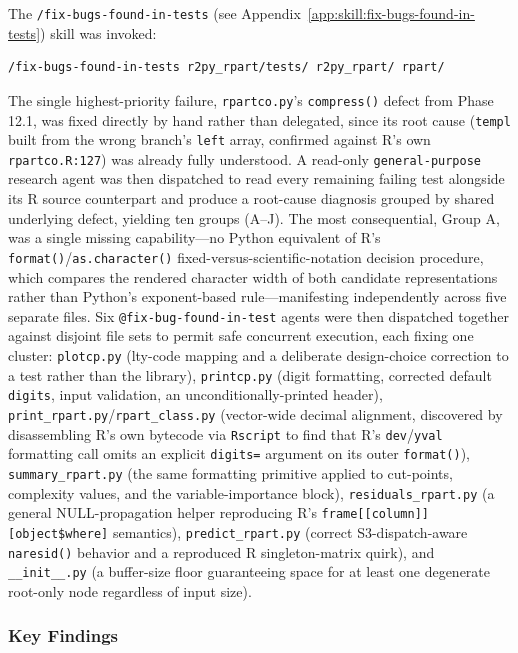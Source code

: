 \documentclass[12pt]{article}
\newcommand{\skillapp}[2]{\texttt{/#1} (see Appendix~\ref{app:skill:#2})}
\begin{document}
The \skillapp{fix-bugs-found-in-tests}{fix-bugs-found-in-tests} skill was invoked:
\begin{lstlisting}[style=skill]
/fix-bugs-found-in-tests r2py_rpart/tests/ r2py_rpart/ rpart/
\end{lstlisting}
The single highest-priority failure, \texttt{rpartco.py}'s \texttt{compress()} defect from Phase 12.1, was fixed directly by hand rather than delegated, since its root cause (\texttt{templ} built from the wrong branch's \texttt{left} array, confirmed against R's own \texttt{rpartco.R:127}) was already fully understood. A read-only \texttt{general-purpose} research agent was then dispatched to read every remaining failing test alongside its R source counterpart and produce a root-cause diagnosis grouped by shared underlying defect, yielding ten groups (A--J). The most consequential, Group A, was a single missing capability---no Python equivalent of R's \texttt{format()}/\texttt{as.character()} fixed-versus-scientific-notation decision procedure, which compares the rendered character width of both candidate representations rather than Python's exponent-based rule---manifesting independently across five separate files. Six \texttt{@fix-bug-found-in-test} agents were then dispatched together against disjoint file sets to permit safe concurrent execution, each fixing one cluster: \texttt{plotcp.py} (lty-code mapping and a deliberate design-choice correction to a test rather than the library), \texttt{printcp.py} (digit formatting, corrected default \texttt{digits}, input validation, an unconditionally-printed header), \texttt{print\_rpart.py}/\texttt{rpart\_class.py} (vector-wide decimal alignment, discovered by disassembling R's own bytecode via \texttt{Rscript} to find that R's \texttt{dev}/\texttt{yval} formatting call omits an explicit \texttt{digits=} argument on its outer \texttt{format()}), \texttt{summary\_rpart.py} (the same formatting primitive applied to cut-points, complexity values, and the variable-importance block), \texttt{residuals\_rpart.py} (a general NULL-propagation helper reproducing R's \texttt{frame[[column]][object\$where]} semantics), \texttt{predict\_rpart.py} (correct S3-dispatch-aware \texttt{naresid()} behavior and a reproduced R singleton-matrix quirk), and \texttt{\_\_init\_\_.py} (a buffer-size floor guaranteeing space for at least one degenerate root-only node regardless of input size).

\subsubsection{Key Findings}
\end{document}
